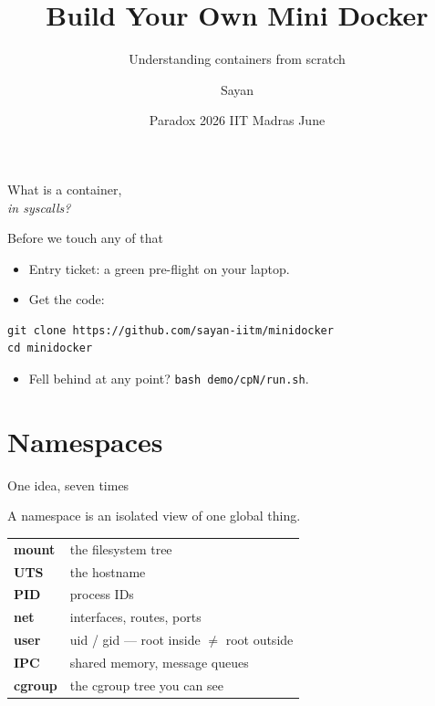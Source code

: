 \documentclass[10pt,aspectratio=169]{beamer}
\title{Build Your Own Mini Docker}
\subtitle{Understanding containers from scratch}
\author{Sayan}
\date{Paradox 2026 \quad\textbar\quad IIT Madras \quad\textbar\quad 11 June}
\newcommand{\cmd}[1]{\texttt{\small #1}}
\begin{document}
\maketitle

\begin{frame}[standout]
  What is a container,\\[0.3em]
  \emph{in syscalls?}
\end{frame}

\begin{frame}[fragile]{Before we touch any of that}
  \begin{itemize}
    \item Entry ticket: a \alert{green pre-flight} on your laptop.
    \item Get the code:
  \end{itemize}
  \begin{lstlisting}
git clone https://github.com/sayan-iitm/minidocker
cd minidocker
  \end{lstlisting}
  \begin{itemize}
    \item Fell behind at any point? \cmd{bash demo/cpN/run.sh}.
  \end{itemize}
\end{frame}

\section{Namespaces}

\begin{frame}{One idea, seven times}
  \begin{center}
    \Large A namespace is an \alert{isolated view} of one global thing.
  \end{center}
  \vspace{1em}
  \begin{center}
  \begin{tabular}{ll}
    \toprule
    \textbf{mount}  & the filesystem tree \\
    \textbf{UTS}    & the hostname \\
    \textbf{PID}    & process IDs \\
    \textbf{net}    & interfaces, routes, ports \\
    \textbf{user}   & uid / gid — root inside $\neq$ root outside \\
    \textbf{IPC}    & shared memory, message queues \\
    \textbf{cgroup} & the cgroup tree you can see \\
    \bottomrule
  \end{tabular}
  \end{center}
\end{frame}
\end{document}
